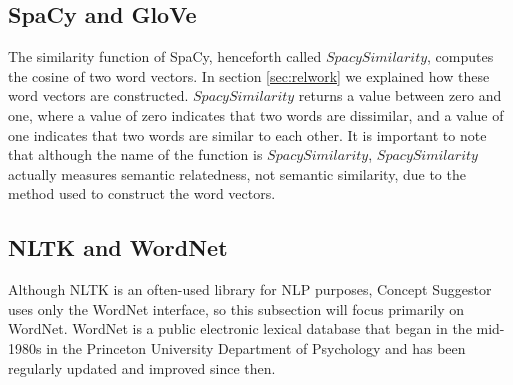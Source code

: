 \documentclass{article}
\begin{document}
\subsection{SpaCy and GloVe}
The similarity function of SpaCy, henceforth called $\textit{SpacySimilarity}$, computes the cosine of two word vectors. In section \ref{sec:relwork} we explained how these word vectors are constructed. $\textit{SpacySimilarity}$ returns a value between zero and one, where a value of zero indicates that two words are dissimilar, and a value of one indicates that two words are similar to each other. It is important to note that although the name of the function is $\textit{SpacySimilarity}$, $\textit{SpacySimilarity}$ actually measures semantic relatedness, not semantic similarity, due to the method used to construct the word vectors. 

\subsection{NLTK and WordNet}
Although NLTK is an often-used library for NLP purposes, Concept Suggestor uses only the WordNet interface, so this subsection will focus primarily on WordNet. WordNet is a public electronic lexical database that began in the mid-1980s in the Princeton University Department of Psychology and has been regularly updated and improved since then. 
\end{document}
